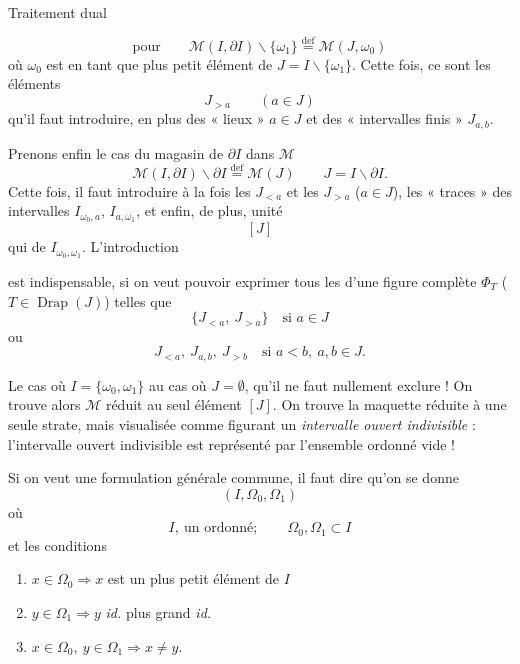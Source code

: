 \documentclass[11pt,a4paper]{article}
\begin{document}
 Traitement dual

\[
  \text{pour}\qquad \mathcal{M}(I,\partial I)\smallsetminus\{\omega_1\} \overset{\mathrm{def}}{=} \mathcal{M}(J,\omega_0)
\]
où $\omega_0$ est  en \struck{\ill{}} tant que plus petit élément de $J=I\smallsetminus\{\omega_1\}$. Cette fois, ce sont les éléments
\[
  J_{>a}\qquad (a\in J)
\]
qu'il faut introduire, en plus des « lieux » $a\in J$ et des « intervalles finis » $J_{a,b}$.

Prenons enfin le cas du magasin  de $\partial I$ dans $\mathcal{M}$
\[
  \mathcal{M}(I,\partial I)\smallsetminus\partial I \overset{\mathrm{def}}{=} \mathcal{M}(J) \qquad J=I\smallsetminus\partial I .
\]
Cette fois, il faut introduire à la fois les $J_{<a}$ et les $J_{>a}$ ($a\in J$),
 les « traces » des intervalles \struck{\ill{}} $I_{\omega_0,a}$, $I_{a,\omega_1}$, et \struck{\ill{}} enfin, de plus,  unité
\[
  [J]
\]
qui  de $I_{\omega_0,\omega_1}$. L'introduction

est indispensable, si on veut pouvoir exprimer tous les \struck{\ill{}} d'une figure complète $\Phi_T$ ($T\in\operatorname{Drap}(J)$) telles que
\[
  \{J_{<a},\ J_{>a}\}\quad\text{si } a\in J
\]
ou
\[
  J_{<a},\ J_{a,b},\ J_{>b}\quad\text{si } a<b,\ a,b\in J .
\]

 Le cas où $I=\{\omega_0,\omega_1\}$  au cas où $J=\emptyset$, qu'il ne faut nullement exclure ! On trouve alors $\mathcal{M}$ réduit au seul élément $[J]$. On trouve la maquette réduite à une seule strate, mais visualisée comme figurant un \textit{intervalle ouvert indivisible} : l'intervalle ouvert indivisible est représenté par l'ensemble ordonné vide !

Si on veut une formulation générale commune, il faut dire qu'on se donne
\[
  (I,\Omega_0,\Omega_1)
\]
où
\[
  I,\ \text{un ordonné}; \qquad \Omega_0,\Omega_1\subset I
\]
et les conditions
\begin{enumerate}
  \item[a)] \struck{$\forall$} $x\in\Omega_0 \Rightarrow x$ est un plus petit élément de $I$
  \item[a')] $y\in\Omega_1 \Rightarrow y$ \textit{id.} plus grand \textit{id.}
  \item[b)] $x\in\Omega_0,\ y\in\Omega_1 \Rightarrow x\neq y$.
\end{enumerate}
\end{document}
